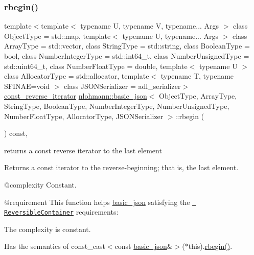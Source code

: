 \subsubsection{\texorpdfstring{rbegin()}{rbegin()}\hspace{0.1cm}{\footnotesize\ttfamily [2/2]}}
{\footnotesize\ttfamily template$<$template$<$ typename U, typename V, typename... Args $>$ class Object\+Type = std\+::map, template$<$ typename U, typename... Args $>$ class Array\+Type = std\+::vector, class String\+Type  = std\+::string, class Boolean\+Type  = bool, class Number\+Integer\+Type  = std\+::int64\+\_\+t, class Number\+Unsigned\+Type  = std\+::uint64\+\_\+t, class Number\+Float\+Type  = double, template$<$ typename U $>$ class Allocator\+Type = std\+::allocator, template$<$ typename T, typename S\+F\+I\+N\+A\+E=void $>$ class J\+S\+O\+N\+Serializer = adl\+\_\+serializer$>$ \\
\mbox{\hyperlink{classnlohmann_1_1basic__json_a72be3c24bfa24f0993d6c11af03e7404}{const\+\_\+reverse\+\_\+iterator}} \mbox{\hyperlink{classnlohmann_1_1basic__json}{nlohmann\+::basic\+\_\+json}}$<$ Object\+Type, Array\+Type, String\+Type, Boolean\+Type, Number\+Integer\+Type, Number\+Unsigned\+Type, Number\+Float\+Type, Allocator\+Type, J\+S\+O\+N\+Serializer $>$\+::rbegin (\begin{DoxyParamCaption}{ }\end{DoxyParamCaption}) const\hspace{0.3cm}{\ttfamily [inline]}, {\ttfamily [noexcept]}}



returns a const reverse iterator to the last element 

Returns a const iterator to the reverse-\/beginning; that is, the last element.

 @complexity Constant.

@requirement This function helps {\ttfamily \mbox{\hyperlink{classnlohmann_1_1basic__json}{basic\+\_\+json}}} satisfying the \href{http://en.cppreference.com/w/cpp/concept/ReversibleContainer}{\texttt{ Reversible\+Container}} requirements\+:
\begin{DoxyItemize}
\item The complexity is constant.
\item Has the semantics of {\ttfamily const\+\_\+cast$<$const \mbox{\hyperlink{classnlohmann_1_1basic__json}{basic\+\_\+json}}\&$>$($\ast$this).\mbox{\hyperlink{classnlohmann_1_1basic__json_a1ef93e2006dbe52667294f5ef38b0b10}{rbegin()}}}.
\end{DoxyItemize}


